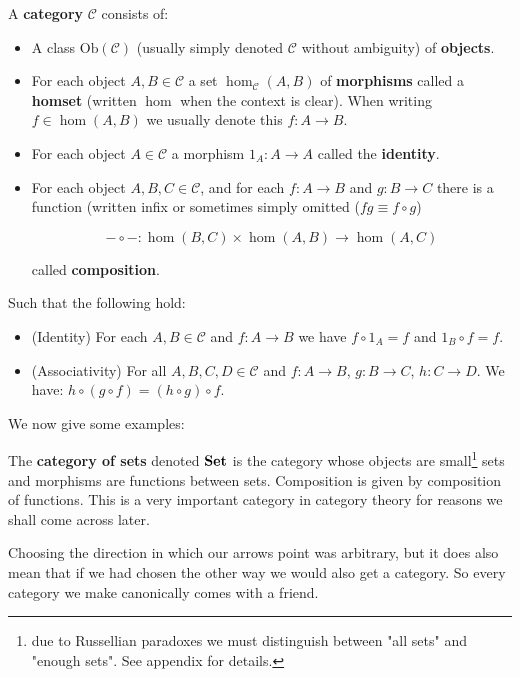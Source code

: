 \begin{defin}
	A {\bf category} $\mathcal{C}$ consists of:
	\begin{itemize}
		\item A class $\mathrm{Ob}(\mathcal{C})$ (usually simply denoted $\mathcal{C}$ without ambiguity) of {\bf objects}.
		\item For each object $A,B \in \mathcal{C}$ a set $\hom_{\mathcal{C}}(A,B)$ of {\bf morphisms} called a {\bf homset} (written $\hom$ when the context is clear). When writing $f \in \hom(A,B)$ we usually denote this $f : A \to B$.
		\item For each object $A \in \mathcal{C}$ a morphism $1_A : A \to A$ called the {\bf identity}.
		\item For each object $A,B,C \in \mathcal{C}$, and for each $f : A \to B$ and $g : B \to C$ there is a function (written infix or sometimes simply omitted ($fg \equiv f \circ g$)
		
		$$
			- \circ - : \hom(B,C) \times \hom(A,B) \to \hom(A,C)
		$$
		
		called {\bf composition}.
	\end{itemize}
	
	Such that the following hold:
	
	\begin{itemize}
		\item (Identity) For each $A,B \in \mathcal{C}$ and $f : A \to B$ we have $f \circ 1_A = f$ and $1_B \circ f = f$.
		\item (Associativity) For all $A,B,C,D \in \mathcal{C}$ and $f : A \to B$, $g : B \to C$, $h : C \to D$. We have: $h \circ (g \circ f) = (h \circ g) \circ f$.
	\end{itemize}
\end{defin}

We now give some examples:

\begin{example}
	The \textbf{category of sets} denoted ${\normalfont\textbf{Set}}$ is the category whose objects are small\footnote{due to Russellian paradoxes we must distinguish between "all sets" and "enough sets". See appendix for details. } sets and morphisms are functions between sets. Composition is given by composition of functions. This is a very important category in category theory for reasons we shall come across later.
\end{example}

Choosing the direction in which our arrows point was arbitrary, but it does also mean that if we had chosen the other way we would also get a category. So every category we make canonically comes with a friend.

